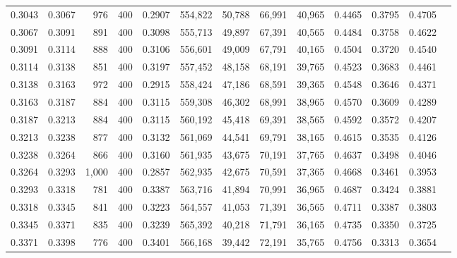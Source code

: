 \begin{tabular}{rrrrrrrrrrrrr}
0.3043 & 0.3067 &    976 &   400 &                                     0.2907 & 554,822 &  50,788 &  66,991 &  40,965 & 0.4465 & 0.3795 & 0.4705 \\
0.3067 & 0.3091 &    891 &   400 &                                     0.3098 & 555,713 &  49,897 &  67,391 &  40,565 & 0.4484 & 0.3758 & 0.4622 \\
0.3091 & 0.3114 &    888 &   400 &                                     0.3106 & 556,601 &  49,009 &  67,791 &  40,165 & 0.4504 & 0.3720 & 0.4540 \\
0.3114 & 0.3138 &    851 &   400 &                                     0.3197 & 557,452 &  48,158 &  68,191 &  39,765 & 0.4523 & 0.3683 & 0.4461 \\
0.3138 & 0.3163 &    972 &   400 &                                     0.2915 & 558,424 &  47,186 &  68,591 &  39,365 & 0.4548 & 0.3646 & 0.4371 \\
0.3163 & 0.3187 &    884 &   400 &                                     0.3115 & 559,308 &  46,302 &  68,991 &  38,965 & 0.4570 & 0.3609 & 0.4289 \\
0.3187 & 0.3213 &    884 &   400 &                                     0.3115 & 560,192 &  45,418 &  69,391 &  38,565 & 0.4592 & 0.3572 & 0.4207 \\
0.3213 & 0.3238 &    877 &   400 &                                     0.3132 & 561,069 &  44,541 &  69,791 &  38,165 & 0.4615 & 0.3535 & 0.4126 \\
0.3238 & 0.3264 &    866 &   400 &                                     0.3160 & 561,935 &  43,675 &  70,191 &  37,765 & 0.4637 & 0.3498 & 0.4046 \\
0.3264 & 0.3293 &  1,000 &   400 &                                     0.2857 & 562,935 &  42,675 &  70,591 &  37,365 & 0.4668 & 0.3461 & 0.3953 \\
0.3293 & 0.3318 &    781 &   400 &                                     0.3387 & 563,716 &  41,894 &  70,991 &  36,965 & 0.4687 & 0.3424 & 0.3881 \\
0.3318 & 0.3345 &    841 &   400 &                                     0.3223 & 564,557 &  41,053 &  71,391 &  36,565 & 0.4711 & 0.3387 & 0.3803 \\
0.3345 & 0.3371 &    835 &   400 &                                     0.3239 & 565,392 &  40,218 &  71,791 &  36,165 & 0.4735 & 0.3350 & 0.3725 \\
0.3371 & 0.3398 &    776 &   400 &                                     0.3401 & 566,168 &  39,442 &  72,191 &  35,765 & 0.4756 & 0.3313 & 0.3654 \\

\end{tabular}
